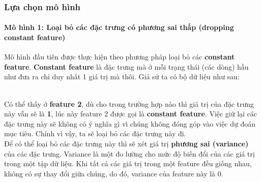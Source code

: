 \documentclass{report}
\begin{document}
    \subsubsection{Lựa chọn mô hình}
        \paragraph{Mô hình 1: Loại bỏ các đặc trưng có phương sai thấp (dropping constant feature)}\label{sec:dropping-constant-feature}
    Mô hình đầu tiên được thực hiện theo phương pháp loại bỏ các \textbf{constant feature}. \textbf{Constant feature} là đặc trưng mà ở mỗi trạng thái (các dòng) hầu như đưa ra chỉ duy nhất 1 giá trị mà thôi. Giả sử ta có bộ dữ liệu như sau:
\begin{table}[h]
    \centering
    \end{table}\\
    Có thể thấy ở \textbf{feature 2}, dù cho trong trường hợp nào thì giá trị của đặc trưng này vẫn sẽ là \textbf{1}, lúc này feature 2 được gọi là \textbf{constant feature}. Việc giữ lại các đặc trưng này sẽ không có ý nghĩa gì vì chúng không đóng góp vào việc dự đoán mục tiêu. Chính vì vậy, ta sẽ loại bỏ các đặc trưng này đi.\\

    Để có thể loại bỏ các đặc trưng này thì sẽ xét giá trị \textbf{phương sai (variance)} của các đặc trưng. Variance là một đo lường cho mức độ biến đổi của các giá trị trong một tập dữ liệu. Khi tất cả các giá trị trong một feature đều giống nhau, không có sự thay đổi giữa chúng, do đó, variance của feature này là 0.\\
\end{document}
